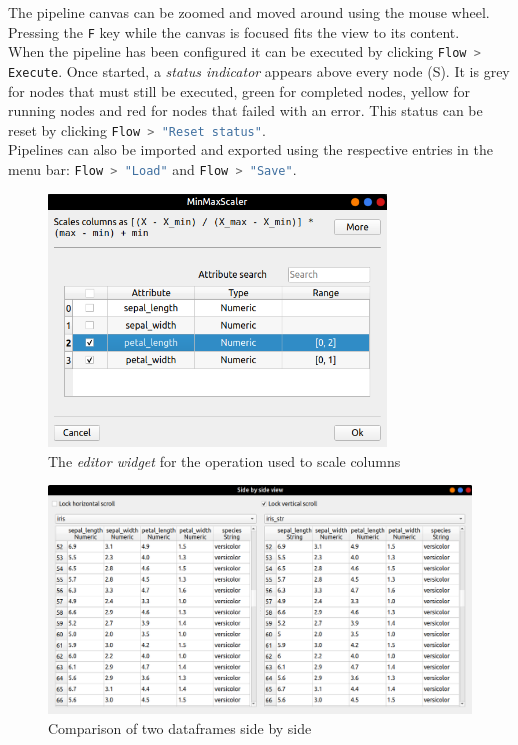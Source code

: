 The pipeline canvas can be zoomed and moved around using the mouse wheel. Pressing the \lstinline[language=bash]|F| key while the canvas is focused fits the view to its content.\\
When the pipeline has been configured it can be executed by clicking \lstinline[language=bash]|Flow > Execute|. Once started, a \textit{status indicator} appears above every node (S). It is grey for nodes that must still be executed, green for completed nodes, yellow for running nodes and red for nodes that failed with an error. This status can be reset by clicking \lstinline[language=bash]|Flow > "Reset status"|.\\
Pipelines can also be imported and exported using the respective entries in the menu bar: \lstinline[language=bash]|Flow > "Load"| and \lstinline[language=bash]|Flow > "Save"|.
\begin{figure}[p]
	\centering
	\includegraphics[width=0.8\textwidth]{scale-editor-w}
	\caption{The \textit{editor widget} for the operation used to scale columns}
	\label{fig:flow-editor-sample}
\end{figure}
\begin{figure}[p]
	\centering
	\includegraphics[width=\textwidth]{compare-df}
	\caption{Comparison of two dataframes side by side}
	\label{fig:compare-df}
\end{figure}

